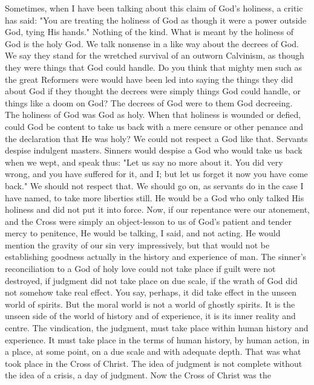 \documentclass[12pt,letterpaper,oneside]{book}
\begin{document}
Sometimes, when I have been talking about 
this claim of God's holiness, a critic has said: 
"You are treating the holiness of God as 
though it were a power outside God, tying 
His hands." Nothing of the kind. What is 
meant by the holiness of God is the holy 
God. We talk nonsense in a like way about 
the decrees of God. We say they stand for 
the wretched survival of an outworn Calvinism, 
as though they were things that God 
could handle. Do you think that mighty men 
such as the great Reformers were would have 
been led into saying the things they did about 
God if they thought the decrees were simply 
things God could handle, or things like a doom 
on God? The decrees of God were to them God 
decreeing. The holiness of God was God as holy. 
When that holiness is wounded or defied, could 
God be content to take us back with a mere 
censure or other penance and the declaration 
that He was holy? We could not respect a God 
like that. Servants despise indulgent masters. 
Sinners would despise a God who would take us 
back when we wept, and speak thus: "Let us 
say no more about it. You did very wrong, and 
you have suffered for it, and I; but let us forget 
it now you have come back." We should not 
respect that. We should go on, as servants do in 
the case I have named, to take more liberties 
still. He would be a God who only talked His 
holiness and did not put it into force. Now, if 
our repentance were our atonement, and the 
Cross were simply an object-lesson to us of 
God's patient and tender mercy to penitence, 
He would be talking, I said, and not acting. He 
would mention the gravity of our sin very impressively, 
but that would not be establishing 
goodness actually in the history and experience 
of man. The sinner's reconciliation to a God 
of holy love could not take place if guilt 
were not destroyed, if judgment did not take 
place on due scale, if the wrath of God did 
not somehow take real effect. You say, perhaps, 
it did take effect in the unseen world 
of spirits. But the moral world is not a world 
of ghostly spirits. It is the unseen side of the 
world of history and of experience, it is its 
inner reality and centre. The vindication, the 
judgment, must take place within human history 
and experience. It must take place in the 
terms of human history, by human action, in a 
place, at some point, on a due scale and with adequate 
depth. That was what took place in the 
Cross of Christ. The idea of judgment is not 
complete without the idea of a crisis, a day of 
judgment. Now the Cross of Christ was the 
\end{document}
